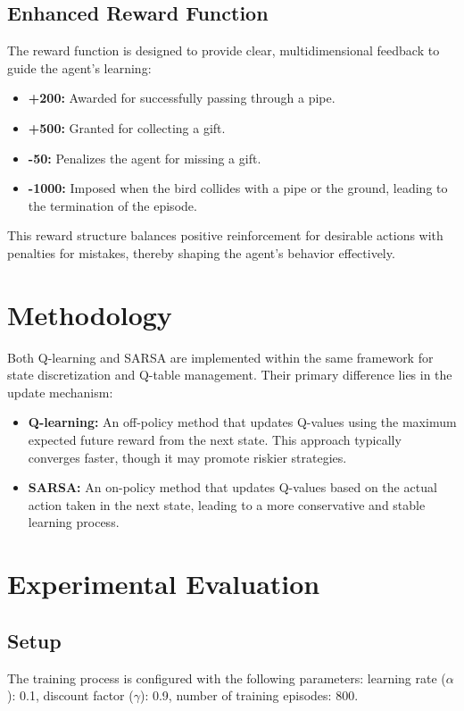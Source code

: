 \documentclass[conference]{IEEEtran}
\begin{document}
\subsection{Enhanced Reward Function}
The reward function is designed to provide clear, multidimensional feedback to guide the agent’s learning:
\begin{itemize}
    \item \textbf{+200:} Awarded for successfully passing through a pipe.
    \item \textbf{+500:} Granted for collecting a gift.
    \item \textbf{-50:} Penalizes the agent for missing a gift.
    \item \textbf{-1000:} Imposed when the bird collides with a pipe or the ground, leading to the termination of the episode.
\end{itemize}
This reward structure balances positive reinforcement for desirable actions with penalties for mistakes, thereby shaping the agent’s behavior effectively.

\section{Methodology}
Both Q-learning and SARSA are implemented within the same framework for state discretization and Q-table management. Their primary difference lies in the update mechanism:
\begin{itemize}
    \item \textbf{Q-learning:} An off-policy method that updates Q-values using the maximum expected future reward from the next state. This approach typically converges faster, though it may promote riskier strategies.
    \item \textbf{SARSA:} An on-policy method that updates Q-values based on the actual action taken in the next state, leading to a more conservative and stable learning process.
\end{itemize}

\section{Experimental Evaluation}
\subsection{Setup}
The training process is configured with the following parameters: learning rate (\(\alpha\)): 0.1, discount factor (\(\gamma\)): 0.9, number of training episodes: 800.
\end{document}
